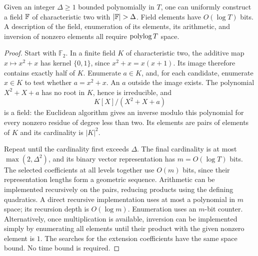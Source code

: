 \begin{lemma}\label{lem:field}
Given an integer $\Delta\ge1$ bounded polynomially in $T$, one can uniformly
construct a field $\mathbb F$ of characteristic two with $|\F|>\Delta$.  Field
elements have $O(\log T)$ bits.  A description of the field, enumeration of its
elements, its arithmetic, and inversion of nonzero elements all require
$\operatorname{polylog} T$ space.
\end{lemma}
\begin{proof}
Start with $\mathbb F_2$.  In a finite field $K$ of characteristic two, the
additive map $x\mapsto x^2+x$ has kernel $\{0,1\}$, since
$x^2+x=x(x+1)$.  Its image therefore contains exactly half of $K$.
Enumerate $a\in K$, and, for each candidate, enumerate $x\in K$ to test
whether $a=x^2+x$.  An $a$ outside the image exists.  The polynomial
$X^2+X+a$ has no root in $K$, hence is irreducible, and
\[
 K[X]/(X^2+X+a)
\]
is a field: the Euclidean algorithm gives an inverse modulo this polynomial
for every nonzero residue of degree less than two.  Its elements are pairs
of elements of $K$ and its cardinality is $|K|^2$.

Repeat until the cardinality first exceeds $\Delta$.  The final cardinality
is at most $\max(2,\Delta^2)$, and its binary vector representation has
$m=O(\log T)$ bits.  The selected coefficients at all levels together use
$O(m)$ bits, since their representation lengths form a geometric sequence.
Arithmetic can be implemented recursively on the pairs, reducing products
using the defining quadratics.  A direct recursive implementation uses at
most a polynomial in $m$ space; its recursion depth is $O(\log m)$.
Enumeration uses an $m$-bit counter.  Alternatively, once multiplication is
available, inversion can be implemented simply by enumerating all elements
until their product with the given nonzero element is $1$.  The searches for
the extension coefficients have the same space bound.  No time bound is
required.
\end{proof}

